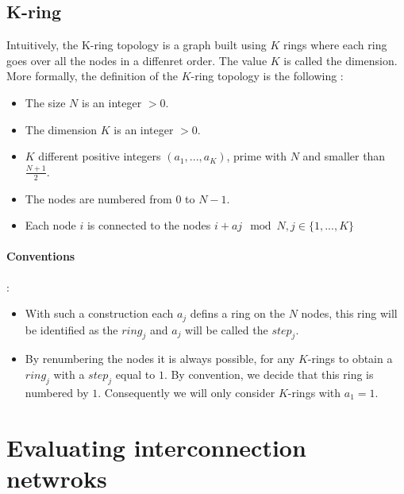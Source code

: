 \documentclass[11pt,a4paper]{report}
\begin{document}

\subsection{K-ring} %
\label{sub:K-ring}

Intuitively, the K-ring topology is a graph built using $K$ rings where each ring goes over all the nodes in a diffenret order. The value $K$ is called the dimension. More formally, the definition of the $K$-ring topology is the following :
\begin{itemize}
    \item The size $N$ is an integer $>0$.
    \item The dimension $K$ is an integer $>0$.
    \item $K$ different positive integers $(a_1,...,a_K)$, prime with $N$ and smaller than $\frac{N+1}{2}$.
    \item The nodes are numbered from $0$ to $N-1$.
    \item Each node $i$ is connected to the nodes $i+aj \mod N, j \in \{1,...,K\}$
\end{itemize}

\paragraph*{Conventions} :
\begin{itemize}
    \item With such a construction each $a_j$ defins a ring on the $N$ nodes, this ring will be identified as the $ring_j$ and $a_j$ will be called the $step_j$.
    \item By renumbering the nodes it is always possible, for any $K$-rings to obtain a $ring_j$ with a $step_j$ equal to $1$. By convention, we decide that this ring is numbered by $1$. Consequently we will only consider $K$-rings with $a_1=1$.
\end{itemize}



\section{Evaluating interconnection netwroks} %
\label{sec:Evaluating interconnection netwroks}
\end{document}
